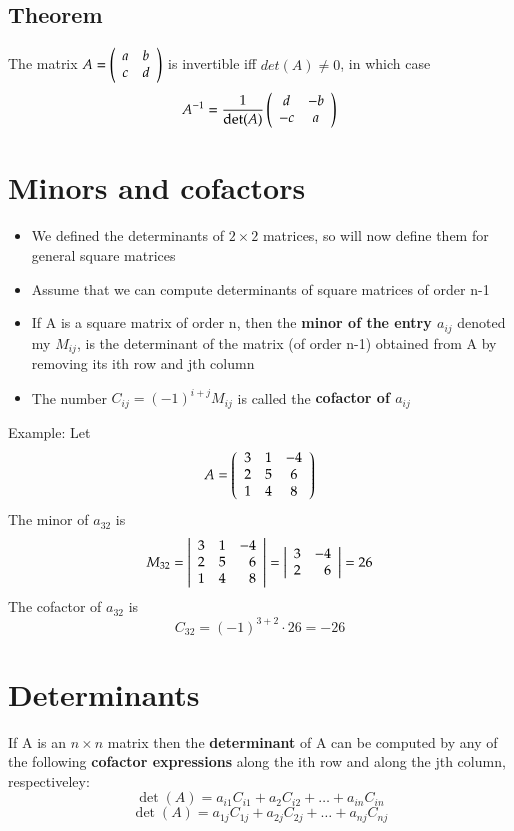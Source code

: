 \documentclass{article}[18pt]
\begin{document}
\subsection{Theorem}
The matrix $A = \left( \begin{array} { l l } { a } & { b } \\ { c } & { d } \end{array} \right)$ is invertible iff $det(A)\neq 0$, in which case
$$A ^ { - 1 } = \frac { 1 } { \operatorname { det } ( A ) } \left( \begin{array} { c c } { d } & { - b } \\ { - c } & { a } \end{array} \right)$$
\section{Minors and cofactors}
\begin{itemize}
	\item We defined the determinants of $2\times 2$ matrices, so will now define them for general square matrices
	\item Assume that we can compute determinants of square matrices of order n-1
	\item If A is a square matrix of order n, then the \textbf{minor of the entry $a_{ij}$} denoted my $M_{ij}$, is the determinant of the matrix (of order n-1) obtained from A by removing its ith row and jth column
	\item The number $C _ { i j } = ( - 1 ) ^ { i + j } M _ { i j }$ is called the \textbf{cofactor of $a_{ij}$}
\end{itemize}
Example: Let
$$A = \left( \begin{array} { c c c } { 3 } & { 1 } & { - 4 } \\ { 2 } & { 5 } & { 6 } \\ { 1 } & { 4 } & { 8 } \end{array} \right)$$
The minor of $a_{32}$ is
$$M _ { 32 } = \left| \begin{array} { r r r } { 3 } & { 1 } & { - 4 } \\ { 2 } & { 5 } & { 6 } \\ { 1 } & { 4 } & { 8 } \end{array} \right| = \left| \begin{array} { r r } { 3 } & { - 4 } \\ { 2 } & { 6 } \end{array} \right| = 26$$
The cofactor of $a_{32}$ is
$$C _ { 32 } = ( - 1 ) ^ { 3 + 2 } \cdot 26 = - 26$$
\section{Determinants}
If A is an $n\times n$ matrix then the \textbf{determinant} of A can be computed by any of the following \textbf{cofactor expressions} along the ith row and along the jth column, respectiveley:
$$\operatorname { det } ( A ) = a _ { i 1 } C _ { i 1 } + a _ { 2 } C _ { i 2 } + \ldots + a _ { i n } C _ { i n }$$
$$\operatorname { det } ( A ) = a _ { 1 j } C _ { 1 j } + a _ { 2 j } C _ { 2 j } + \ldots + a _ { n j } C _ { n j }$$
\end{document}
